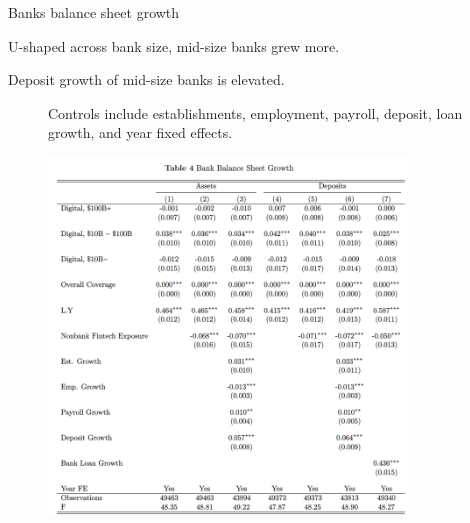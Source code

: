 \documentclass[notes,10pt, aspectratio=169]{beamer}
\newenvironment{wideitemize}{\itemize\addtolength{\itemsep}{10pt}}{\enditemize}
\begin{document}
\begin{frame}{Banks balance sheet growth}
    \begin{wideitemize}
        \item U-shaped across bank size, mid-size banks grew more.
        \item Deposit growth of mid-size banks is elevated.
    \end{wideitemize}

    \begin{figure}
    \centering
    \begin{minipage}{0.9\textwidth}
 {\footnotesize
 Controls include establishments, employment, payroll, deposit, loan growth, and year fixed effects.}
        \end{minipage}
    \includegraphics[width=0.85\textwidth]{imgs/tab4.png}
    \end{figure}
\end{frame}
\end{document}
